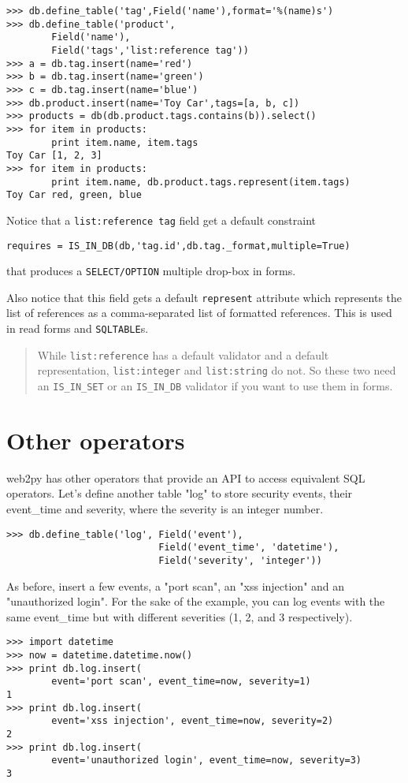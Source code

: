 \documentclass[justified,sixbynine,notoc]{tufte-book}
\def\ft{\small\tt}
\def\inxx#1{\index{#1}}
\begin{document}
\begin{fullwidth}
\begin{lstlisting}
>>> db.define_table('tag',Field('name'),format='%(name)s')
>>> db.define_table('product',
        Field('name'),
        Field('tags','list:reference tag'))
>>> a = db.tag.insert(name='red')
>>> b = db.tag.insert(name='green')
>>> c = db.tag.insert(name='blue')
>>> db.product.insert(name='Toy Car',tags=[a, b, c])
>>> products = db(db.product.tags.contains(b)).select()
>>> for item in products:
        print item.name, item.tags
Toy Car [1, 2, 3]
>>> for item in products:
        print item.name, db.product.tags.represent(item.tags)
Toy Car red, green, blue
\end{lstlisting}

Notice that a {\ft list:reference tag} field get a default constraint

\begin{lstlisting}
requires = IS_IN_DB(db,'tag.id',db.tag._format,multiple=True)
\end{lstlisting}
\noindent that produces a {\ft SELECT/OPTION} multiple drop-box in forms.

Also notice that this field gets a default {\ft represent} attribute which represents the list of references as a comma-separated list of formatted references. This is used in read forms and {\ft SQLTABLE}s.

\begin{quote}While {\ft list:reference} has a default validator and a default representation, {\ft list:integer} and {\ft list:string} do not. So these two need an {\ft IS\_IN\_SET} or an {\ft IS\_IN\_DB} validator if you want to use them in forms.\end{quote}
\goodbreak\section{Other operators}
\noindent web2py has other operators that provide an API to access equivalent SQL operators.
Let's define another table "log" to store security events, their event\_time and severity, where the severity is an integer number.

\inxx{date} \inxx{datetime} \inxx{time}
\begin{lstlisting}
>>> db.define_table('log', Field('event'),
                           Field('event_time', 'datetime'),
                           Field('severity', 'integer'))
\end{lstlisting}

As before, insert a few events, a "port scan", an "xss injection" and an "unauthorized login".
For the sake of the example, you can log events with the same event\_time but with different severities (1, 2, and 3 respectively).
\begin{lstlisting}
>>> import datetime
>>> now = datetime.datetime.now()
>>> print db.log.insert(
        event='port scan', event_time=now, severity=1)
1
>>> print db.log.insert(
        event='xss injection', event_time=now, severity=2)
2
>>> print db.log.insert(
        event='unauthorized login', event_time=now, severity=3)
3
\end{lstlisting}


\end{fullwidth}
\end{document}
